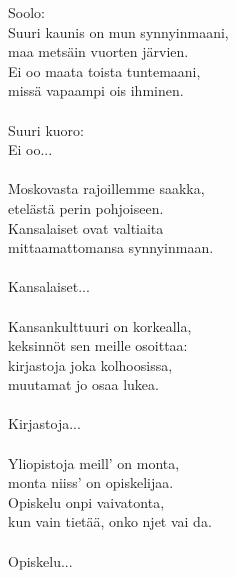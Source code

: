 
            Soolo: \\
            Suuri kaunis on mun synnyinmaani, \\
            maa metsäin vuorten järvien. \\
            Ei oo maata toista tuntemaani, \\
            missä vapaampi ois ihminen. \\
\hspace{10mm} \\
            Suuri kuoro: \\
            Ei oo... \\
\hspace{10mm} \\
            Moskovasta rajoillemme saakka, \\
            etelästä perin pohjoiseen. \\
            Kansalaiset ovat valtiaita \\
            mittaamattomansa synnyinmaan. \\
\hspace{10mm} \\
            Kansalaiset... \\
\hspace{10mm} \\
            Kansankulttuuri on korkealla, \\
            keksinnöt sen meille osoittaa: \\
            kirjastoja joka kolhoosissa, \\
            muutamat jo osaa lukea. \\
\hspace{10mm} \\
            Kirjastoja... \\
\hspace{10mm} \\
            Yliopistoja meill’ on monta, \\
            monta niiss’ on opiskelijaa. \\
            Opiskelu onpi vaivatonta, \\
            kun vain tietää, onko njet vai da. \\
\hspace{10mm} \\
            Opiskelu... \\
\hspace{10mm} \\
